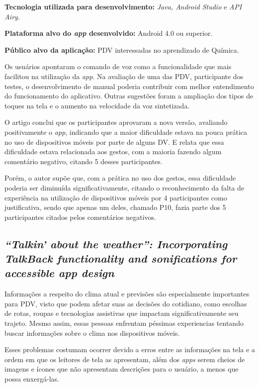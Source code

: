 \textbf{Tecnologia utilizada para desenvolvimento:} \emph{Java, Android Studio} e \emph{API Airy}.

\textbf{Plataforma alvo do \emph{app} desenvolvido:} Android 4.0 ou superior.

\textbf{Público alvo da aplicação:} PDV interessadas no aprendizado de Química\@.

Os usuários apontaram o comando de voz como a funcionalidade que mais facilitou na utilização da \emph{app}.
Na avaliação de uma das PDV, participante dos testes, o desenvolvimento de manual poderia contribuir com melhor entendimento do funcionamento do aplicativo.
Outras sugestões foram a ampliação dos tipos de toques na tela e o aumento na velocidade da voz sintetizada.

O artigo conclui que os participantes aprovaram a nova versão, avaliando positivamente o \emph{app}, indicando que a maior dificuldade estava na pouca prática no uso de dispositivos móveis por parte de alguns DV\@.
E relata que essa dificuldade estava relacionada aos gestos, com a maioria fazendo algum comentário negativo, citando 5 desses participantes.

Porém, o autor supõe que, com a prática no uso dos gestos, essa dificuldade poderia ser diminuída significativamente, citando o reconhecimento da falta de experiência na utilização de dispositivos móveis por 4 participantes como justificativa, sendo que apenas um deles, chamado P10, fazia parte dos 5 participantes citados pelos comentários negativos.

\subsection{\emph{``Talkin' about the weather'': Incorporating TalkBack functionality and sonifications for accessible app design}}

Informações a respeito do clima atual e previsões são especialmente importantes para PDV, visto que podem afetar suas as decisões
do cotidiano, como escolhas de rotas, roupas e tecnologias assistivas que impactam significativamente seu trajeto.
Mesmo assim, essas pessoas enfrentam péssimas experiencias tentando buscar informações sobre o clima nos dispositivos móveis.

Esses problemas costumam ocorrer devido a erros entre as informações na tela e a ordem em que os leitores de tela as apresentam, além dos
\emph{apps} serem cheios de imagens e ícones que não apresentam descrições para o usuário, a menos que possa enxergá-las.

